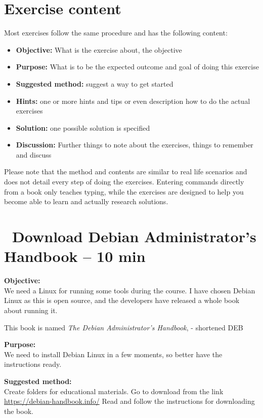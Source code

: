 \documentclass[a4paper,11pt,notitlepage]{report}
\begin{document}
\chapter*{\color{titlecolor}Exercise content}

Most exercises follow the same procedure and has the following content:
\begin{itemize}
\item {\bf Objective:} What is the exercise about, the objective
\item {\bf Purpose:} What is to be the expected outcome and goal of doing this exercise
\item {\bf Suggested method:} suggest a way to get started
\item {\bf Hints:} one or more hints and tips or even description how to
do the actual exercises
\item {\bf Solution:} one possible solution is specified
\item {\bf Discussion:} Further things to note about the exercises, things to remember and discuss
\end{itemize}

Please note that the method and contents are similar to real life scenarios and does not detail every step of doing the exercises. Entering commands directly from a book only teaches typing, while the exercises are designed to help you become able to learn and actually research solutions.


\chapter{\faExclamationTriangle\ Download Debian Administrator’s Handbook -- 10 min}
\label{ex:sw-downloadDEB}



{\bf Objective:}\\
We need a Linux for running some tools during the course. I have chosen Debian Linux as this is open source, and the developers have released a whole book about running it.

This book is named
\emph{The Debian Administrator’s Handbook},  - shortened DEB

{\bf Purpose:}\\
We need to install Debian Linux in a few moments, so better have the instructions ready.

{\bf Suggested method:}\\
Create folders for educational materials. Go to download from the link \url{https://debian-handbook.info/}
Read and follow the instructions for downloading the book.
\end{document}
